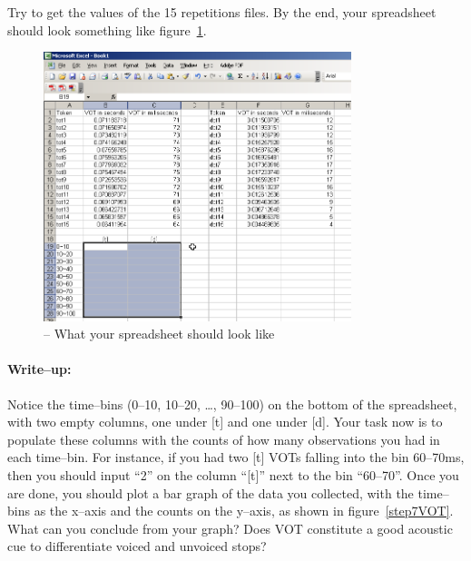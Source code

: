 Try to get the values of the 15 repetitions files. By the end, your spreadsheet should look something like figure~\ref{step6VOT}.

\begin{figure}[!tbp]
\caption{\MSExcel{} -- What your spreadsheet should look like}
\label{step6VOT}
	\begin{center}
		\includegraphics[width=0.8\textwidth]{./figures/Part-C-VOT-thedotthetot-Excel03}
	\end{center}
\end{figure}

\paragraph{Write--up:} Notice the time--bins (0--10, 10--20, \dots{}, 90--100) on the bottom of the spreadsheet, with two empty columns, one under [t] and one under [d]. Your task now is to populate these columns with the counts of how many observations you had in each time--bin. For instance, if you had two [t] VOTs falling into the bin 60--70ms, then you should input ``2'' on the column ``[t]'' next to the bin ``60--70''. Once you are done, you should plot a bar graph of the data you collected, with the time--bins as the x--axis and the counts on the y--axis, as shown in figure~\ref{step7VOT}. What can you conclude from your graph? Does VOT constitute a good acoustic cue to differentiate voiced and unvoiced stops?

